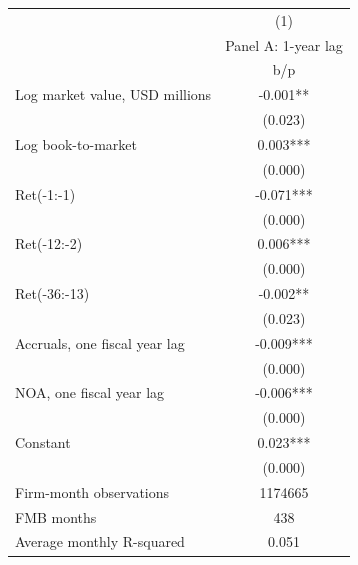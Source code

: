 {
\def\sym#1{\ifmmode^{#1}\else\(^{#1}\)\fi}
\begin{tabular}{l*{1}{c}}
\hline\hline
                    &\multicolumn{1}{c}{(1)}\\
                    &\multicolumn{1}{c}{Panel A: 1-year lag}\\
                    &         b/p   \\
\hline
Log market value, USD millions&      -0.001** \\
                    &     (0.023)   \\
Log book-to-market  &       0.003***\\
                    &     (0.000)   \\
Ret(-1:-1)          &      -0.071***\\
                    &     (0.000)   \\
Ret(-12:-2)         &       0.006***\\
                    &     (0.000)   \\
Ret(-36:-13)        &      -0.002** \\
                    &     (0.023)   \\
Accruals, one fiscal year lag&      -0.009***\\
                    &     (0.000)   \\
NOA, one fiscal year lag&      -0.006***\\
                    &     (0.000)   \\
Constant            &       0.023***\\
                    &     (0.000)   \\
\hline
Firm-month observations&     1174665   \\
FMB months          &         438   \\
Average monthly R-squared&       0.051   \\
\hline\hline
\end{tabular}
}
